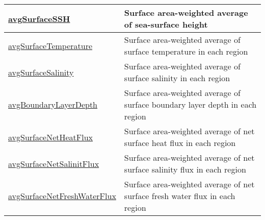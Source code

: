 {\begin{center}
\begin{longtable}{| p{2.0in} | p{4.0in} |}
    \hline
    \hyperref[subsec:var_sec_surfaceAreaWeightedAveragesAM_avgSurfaceSSH]{avgSurfaceSSH} & Surface area-weighted average of sea-surface height \\
    \hline
    \hyperref[subsec:var_sec_surfaceAreaWeightedAveragesAM_avgSurfaceTemperature]{avgSurfaceTemperature} & Surface area-weighted average of surface temperature in each region \\
    \hline
    \hyperref[subsec:var_sec_surfaceAreaWeightedAveragesAM_avgSurfaceSalinity]{avgSurfaceSalinity} & Surface area-weighted average of surface salinity in each region \\
    \hline
    \hyperref[subsec:var_sec_surfaceAreaWeightedAveragesAM_avgBoundaryLayerDepth]{avgBoundaryLayerDepth} & Surface area-weighted average of surface boundary layer depth in each region \\
    \hline
    \hyperref[subsec:var_sec_surfaceAreaWeightedAveragesAM_avgSurfaceNetHeatFlux]{avgSurfaceNetHeatFlux} & Surface area-weighted average of net surface heat flux in each region \\
    \hline
    \hyperref[subsec:var_sec_surfaceAreaWeightedAveragesAM_avgSurfaceNetSalinitFlux]{avgSurfaceNetSalinitFlux} & Surface area-weighted average of net surface salinity flux in each region \\
    \hline
    \hyperref[subsec:var_sec_surfaceAreaWeightedAveragesAM_avgSurfaceNetFreshWaterFlux]{avgSurfaceNetFreshWaterFlux} & Surface area-weighted average of net surface fresh water flux in each region \\
    \hline
\end{longtable}
\end{center}
}
